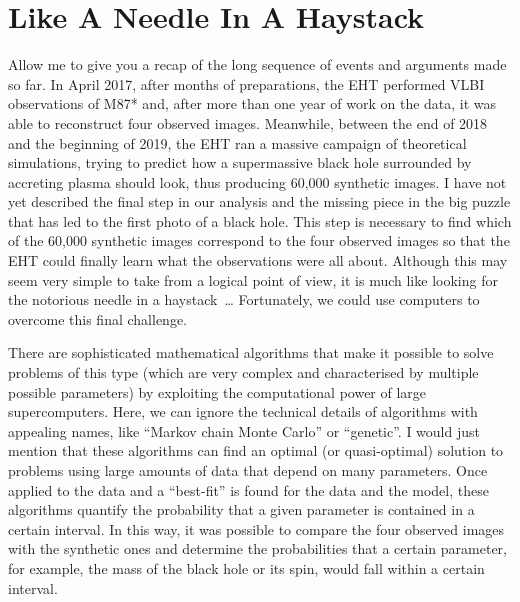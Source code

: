 \section{Like A Needle In A Haystack}\label{sec:07-needle}

Allow me to give you a recap of the long sequence of events and arguments made so far.
In April 2017, after months of preparations, the EHT performed VLBI observations of
M87* and, after more than one year of work on the data, it was able
to reconstruct four observed images. Meanwhile, between the end of 2018 and the
beginning of 2019, the EHT ran a massive campaign of theoretical simulations, trying to
predict how a supermassive black hole surrounded by accreting plasma
should look, thus producing 60,000 synthetic images. I have not yet described the final
step in our analysis and the missing piece in the big puzzle that has led to the first
photo of a black hole. This step is necessary to find which of the 60,000 synthetic
images correspond to the four observed images so that the EHT could finally learn what
the observations were all about. Although this may seem very simple to take from a
logical point of view, it is much like looking for the notorious needle in a
haystack~\ldots{} Fortunately, we could use computers to overcome this final challenge.

There are sophisticated mathematical algorithms that make it possible to solve problems
of this type (which are very complex and characterised by multiple possible parameters)
by exploiting the computational power of large supercomputers. Here,
we can ignore the technical details of algorithms with appealing
names, like ``Markov chain Monte Carlo'' or ``genetic''. I would just
mention that these algorithms can find an optimal (or quasi-optimal) solution to
problems using large amounts of data that depend on many parameters. Once applied to the
data and a ``best-fit'' is found for the data and the model, these algorithms quantify
the probability that a given parameter is contained in a certain interval. In this way,
it was possible to compare the four observed images with the synthetic ones and
determine the probabilities that a certain parameter, for example, the mass of the black
hole or its spin, would fall within a certain interval.

